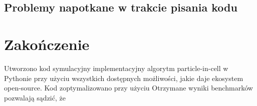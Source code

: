     \subsection{Problemy napotkane w trakcie pisania kodu}

    \section[Zakończenie]{Zakończenie} %
    Utworzono kod symulacyjny implementacyjny algorytm particle-in-cell w Pythonie przy użyciu wszystkich dostępnych
    możliwości, jakie daje ekosystem open-source. Kod zoptymalizowano przy użyciu %
    Otrzymane wyniki benchmarków pozwalają sądzić, że %
